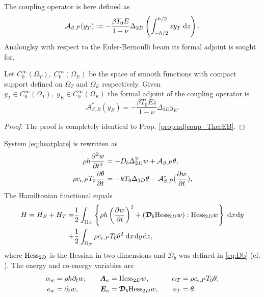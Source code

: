 The coupling operator is here defined as 
\begin{equation}\label{eq:coup_TherK}
\mathcal{A}_{\beta, P}(y_T) :=- \frac{\beta T_0 E}{1 - \nu} \Delta_{2D} \left(\int_{-h/2}^{h/2} z y_T \d{z}\right).
\end{equation}
Analouglsy with respect to the Euler-Bernoulli beam its formal adjoint is sought for.
\begin{proposition}\label{prop:adjcoup_TherK}
	Let $C_0^{\infty}(\Omega_T), \; C_0^{\infty}(\Omega_E)$ be the space of smooth functions with compact support defined on $\Omega_T$ and $\Omega_E$ respectively. Given $y_T \in C_0^{\infty}(\Omega_T), \; y_E \in C_0^{\infty}(\Omega_E)$ the formal adjoint of the coupling operator is 
	\begin{equation}\label{eq:adjcoup_TherP}
	\mathcal{A}_{\beta, B}^*(y_E) = - \frac{\beta T_0 E z}{1-\nu}  \Delta_{2D} y_E.
	\end{equation}
	\begin{proof}
		The proof is completely identical to Prop. \ref{prop:adjcoup_TherEB}.
	\end{proof}
\end{proposition}
 System \ref{eq:heatplate} is rewritten as
\begin{equation}\label{eq:heatplate2}
\begin{aligned}
\rho h \diffp[2]{w}{t} &= -D_b \Delta^2_{2D} w +  \mathcal{A}_{\beta, P} \theta, \\
{\rho c_{\epsilon, P} T_0} \diffp{\theta}{t} &= - {k T_0} \Delta_{3D} \theta -  \mathcal{A}_{\beta, P}^* (\diffp{w}{t}),
\end{aligned}
\end{equation} 
The Hamiltonian functional equals
\begin{equation}
\begin{aligned}
H = H_E + H_T =& \frac{1}{2} \int_{\Omega_E}\left\{\rho h \left(\diffp{w}{t}\right)^2 + (\bm{\mathcal{D}}_b {\Hess}_{2D} w) : {\Hess}_{2D} w\right\} \d{x}\d{y} \\
+  &\frac{1}{2} \int_{\Omega_T}\rho c_{\epsilon, P} T_0 \theta^2\d{x}\d{y}\d{z},
\end{aligned}
\end{equation}
where $\operatorname*{Hess}_{2D}$ is the Hessian in two dimensions and $\bm{\mathcal{D}}_b$ was defined in \eqref{eq:Db} (cf. ). The energy and co-energy variables are
\begin{equation}
\begin{aligned}[t]
\alpha_w &= \rho h \partial_t w, \\
e_w &= \partial_t w,
\end{aligned} \qquad 
\begin{aligned}[t]
\bm{A}_\kappa &= {\operatorname*{Hess}}_{2D} w, \\
\bm{E}_\kappa &=  \bm{\mathcal{D}}_b {\operatorname*{Hess}}_{2D} w, \\
\end{aligned} \qquad 
\begin{aligned}[t]
\alpha_T &= {\rho c_{\epsilon, P} T_0}  \theta, \\
e_T & = \theta.
\end{aligned}
\end{equation}
